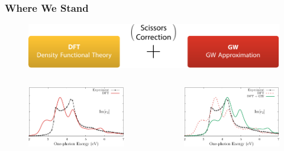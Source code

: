 \documentclass{beamer}
\begin{document}
\begin{frame}
\frametitle{Where We Stand}
\begin{figure}
\centering
\includegraphics[width=\textwidth]{diag-methods_us}
\end{figure}
\vspace{-0.5cm}
\begin{columns}
\begin{figure}
\centering
\includegraphics[width=\textwidth]{fig-mbpt01}
\end{figure}
\begin{figure}
\centering
\includegraphics[width=\textwidth]{fig-mbpt02}
\end{figure}
\end{columns}
\end{frame}
\end{document}
